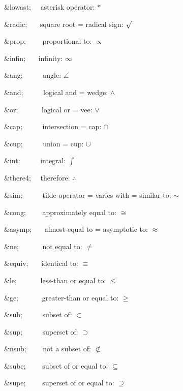 \begin{DoxyItemize}
\item {\ttfamily \&lowast;}{\ttfamily ~~} asterisk operator\+: {$\ast$} 
\item {\ttfamily \&radic;}{\ttfamily ~~~} square root = radical sign\+: {$\surd$} 
\item {\ttfamily \&prop;}{\ttfamily ~~~~} proportional to\+: {$\propto$} 
\item {\ttfamily \&infin;}{\ttfamily ~~~} infinity\+: {$\infty$} 
\item {\ttfamily \&ang;}{\ttfamily ~~~~~} angle\+: {$\angle$} 
\item {\ttfamily \&and;}{\ttfamily ~~~~~} logical and = wedge\+: {$\wedge$} 
\item {\ttfamily \&or;}{\ttfamily ~~~~~~} logical or = vee\+: {$\vee$} 
\item {\ttfamily \&cap;}{\ttfamily ~~~~~} intersection = cap\+: {$\cap$} 
\item {\ttfamily \&cup;}{\ttfamily ~~~~~} union = cup\+: {$\cup$} 
\item {\ttfamily \&int;}{\ttfamily ~~~~~} integral\+: {$\int$} 
\item {\ttfamily \&there4;}{\ttfamily ~~} therefore\+: {$\therefore$} 
\item {\ttfamily \&sim;}{\ttfamily ~~~~~} tilde operator = varies with = similar to\+: {$\sim$} 
\item {\ttfamily \&cong;}{\ttfamily ~~~~} approximately equal to\+: {$\cong$} 
\item {\ttfamily \&asymp;}{\ttfamily ~~~} almost equal to = asymptotic to\+: {$\approx$} 
\item {\ttfamily \&ne;}{\ttfamily ~~~~~~} not equal to\+: {$\ne$} 
\item {\ttfamily \&equiv;}{\ttfamily ~~~} identical to\+: {$\equiv$} 
\item {\ttfamily \&le;}{\ttfamily ~~~~~~} less-\/than or equal to\+: {$\le$} 
\item {\ttfamily \&ge;}{\ttfamily ~~~~~~} greater-\/than or equal to\+: {$\ge$} 
\item {\ttfamily \&sub;}{\ttfamily ~~~~~} subset of\+: {$\subset$} 
\item {\ttfamily \&sup;}{\ttfamily ~~~~~} superset of\+: {$\supset$} 
\item {\ttfamily \&nsub;}{\ttfamily ~~~~} not a subset of\+: {$\not\subset$} 
\item {\ttfamily \&sube;}{\ttfamily ~~~~} subset of or equal to\+: {$\subseteq$} 
\item {\ttfamily \&supe;}{\ttfamily ~~~~} superset of or equal to\+: {$\supseteq$} 

\end{DoxyItemize}

